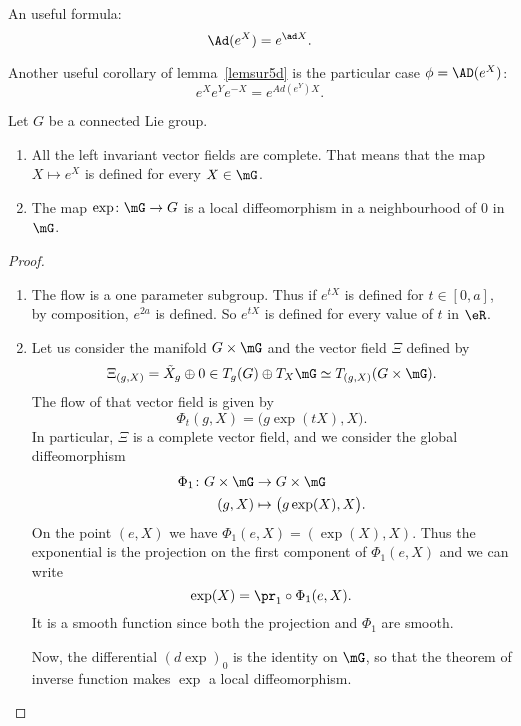 \begin{corollary}\label{Ad_e}
An useful formula:
\[
   \Ad(e^X)=e^{\ad X}.
\]
\end{corollary}

\begin{corollary}
Another useful corollary of lemma~\ref{lemsur5d} is the particular case $\phi=\AD(e^X)$:
\[
   e^Xe^Ye^{-X}=e^{Ad(e^Y)X}.
\]
\label{cor:eXeYe-X}
\end{corollary}

\begin{proposition}
	Let $G$ be a connected Lie group.
	\begin{enumerate}

		\item
			All the left invariant vector fields are complete. That means that the map $X\mapsto  e^{X}$ is defined for every $X\in \mG$.
		\item
			The map $\exp\colon \mG\to G$ is a local diffeomorphism in a neighbourhood of $0$ in $\mG$.
	\end{enumerate}
\end{proposition}

\begin{proof}
	\begin{enumerate}

		\item
			The flow is a one parameter subgroup. Thus if $ e^{tX}$ is defined for $t\in[0,a]$, by composition, $ e^{2a}$ is defined. So $ e^{tX}$ is defined for every value of $t$ in $\eR$.
		\item
			Let us consider the manifold $G\times \mG$ and the vector field $\Xi$ defined by
			\begin{equation}
				\Xi_{(g,X)}=\tilde X_g\oplus 0\in T_g(G)\oplus T_X\mG\simeq T_{(g,X)}(G\times \mG).
			\end{equation}
			The flow of that vector field is given by
			\begin{equation}
				\Phi_t(g,X)=\big( g\exp(tX),X \big).
			\end{equation}
			In particular, $\Xi$ is a complete vector field, and we consider the global diffeomorphism
			\begin{equation}
				\begin{aligned}
					\Phi_1\colon G\times \mG&\to G\times \mG \\
					(g,X)&\mapsto \big( g\exp(X),X \big).
				\end{aligned}
			\end{equation}
			On the point $(e,X)$ we have $\Phi_1(e,X)=(\exp(X),X)$. Thus the exponential is the projection on the first component of $\Phi_1(e,X)$ and we can write
			\begin{equation}
				\exp(X)=\pr_1\circ\Phi_1(e,X).
			\end{equation}
			It is a smooth function since both the projection and $\Phi_1$ are smooth.

			Now, the differential $(d\exp)_0$ is the identity on $\mG$, so that the theorem of inverse function makes $\exp$ a local diffeomorphism.
	\end{enumerate}
\end{proof}


